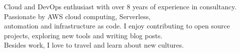 

\begin{cvparagraph}

Cloud and DevOps enthusiast with over 8 years of experience in consultancy.
Passionate by AWS cloud computing, Serverless,\\automation and infrastructure as code. 
I enjoy contributing to open source projects, exploring new tools and writing blog posts.\\
Besides work, I love to travel and learn about new cultures. 
\end{cvparagraph}
